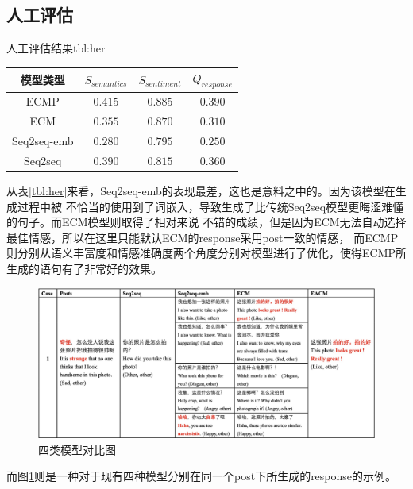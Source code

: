 \documentclass[supercite]{HustGraduPaper}
\theoremstyle{definition}
\begin{document}
\subsection{人工评估}
\begin{generaltab}{人工评估结果}{tbl:her}
  \begin{tabular}{c|ccc}
    \toprule
    模型类型 & $S_{semantics}$ & $S_{sentiment}$ & $Q_{response}$\\
    \midrule
    ECMP & $0.415$ & $0.885$ & $0.390$\\
    ECM & $0.355$ & $0.870$ & $0.310$\\
    Seq2seq-emb & $0.280$ & $0.795$ & $0.250$\\
    Seq2seq & $0.390$ & $0.815$ & $0.360$\\
    \bottomrule
  \end{tabular}
\end{generaltab}
从表\ref{tbl:her}来看，Seq2seq-emb的表现最差，这也是意料之中的。因为该模型在生成过程中被
不恰当的使用到了词嵌入，导致生成了比传统Seq2seq模型更晦涩难懂的句子。而ECM模型则取得了相对来说
不错的成绩，但是因为ECM无法自动选择最佳情感，所以在这里只能默认ECM的response采用post一致的情感，
而ECMP则分别从语义丰富度和情感准确度两个角度分别对模型进行了优化，使得ECMP所生成的语句有了非常好的效果。
\begin{figure}[H] %
  \centering %
  \includegraphics[width=1\textwidth]{images/4models.png} %
  \caption{四类模型对比图} %
  \label{Fig.4models} %
\end{figure}
而图\ref{Fig.4models}则是一种对于现有四种模型分别在同一个post下所生成的response的示例。
\end{document}
